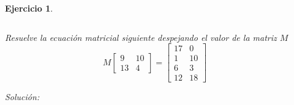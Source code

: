 \documentclass[12pt]{amsart}
\newtheorem{ejer}{Ejercicio}
\begin{document}
\begin{ejer}
\begin{minipage}{\textwidth}
\begin{tcolorbox}[colback = blue!20!white,title=Versión Sistema Matricial]
\[\]\end{tcolorbox}
\end{minipage} \newline
\noindent\begin{minipage}{\textwidth} 
\begin{tcolorbox}[colback = red!20!white,title=Versión Ecuación Matricial]
Resuelve la ecuación matricial siguiente despejando el valor de la matriz $M$
\[M \left[\begin{array}{rr}
9 & 10 \\
13 & 4
\end{array}\right] = \left[\begin{array}{rr}
17 & 0 \\
1 & 10 \\
6 & 3 \\
12 & 18
\end{array}\right] \quad 
\]
\end{tcolorbox}
\end{minipage}%
\end{ejer}


{\it Soluci\'on:}

\end{document}
